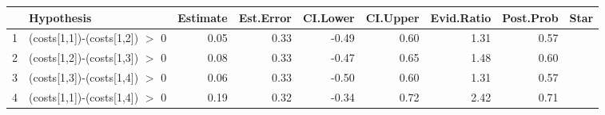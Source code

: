 \begin{table}[ht]
\centering
\begin{tabular}{rlrrrrrrl}
  \hline
 & Hypothesis & Estimate & Est.Error & CI.Lower & CI.Upper & Evid.Ratio & Post.Prob & Star \\ 
  \hline
1 & (costs[1,1])-(costs[1,2]) $>$ 0 & 0.05 & 0.33 & -0.49 & 0.60 & 1.31 & 0.57 &  \\ 
  2 & (costs[1,2])-(costs[1,3]) $>$ 0 & 0.08 & 0.33 & -0.47 & 0.65 & 1.48 & 0.60 &  \\ 
  3 & (costs[1,3])-(costs[1,4]) $>$ 0 & 0.06 & 0.33 & -0.50 & 0.60 & 1.31 & 0.57 &  \\ 
  4 & (costs[1,1])-(costs[1,4]) $>$ 0 & 0.19 & 0.32 & -0.34 & 0.72 & 2.42 & 0.71 &  \\ 
   \hline
\end{tabular}
\end{table}
